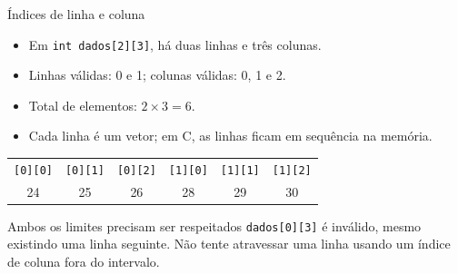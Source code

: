 \begin{frame}{Índices de linha e coluna}
\begin{itemize}
\item Em \texttt{int dados[2][3]}, há duas linhas e três colunas.
\item Linhas válidas: 0 e 1; colunas válidas: 0, 1 e 2.
\item Total de elementos: $2 \times 3 = 6$.
\item Cada linha é um vetor; em C, as linhas ficam em sequência na memória.
\end{itemize}
\begin{center}
\begin{tabular}{cccccc}
\toprule
\texttt{[0][0]} & \texttt{[0][1]} & \texttt{[0][2]} & \texttt{[1][0]} & \texttt{[1][1]} & \texttt{[1][2]} \\
24 & 25 & 26 & 28 & 29 & 30 \\
\bottomrule
\end{tabular}
\end{center}
\begin{alertblock}{Ambos os limites precisam ser respeitados}
\texttt{dados[0][3]} é inválido, mesmo existindo uma linha seguinte. Não tente atravessar uma linha usando um índice de coluna fora do intervalo.
\end{alertblock}
\end{frame}
